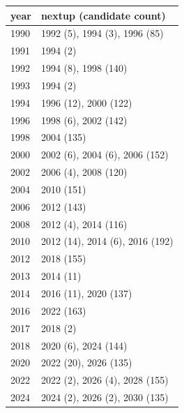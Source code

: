 \footnotesize\begin{tabular}[t]{ll}
\toprule
year & nextup (candidate count)\\
\midrule
1990 & 1992 (5), 1994 (3), 1996 (85)\\
1991 & 1994 (2)\\
1992 & 1994 (8), 1998 (140)\\
1993 & 1994 (2)\\
1994 & 1996 (12), 2000 (122)\\
1996 & 1998 (6), 2002 (142)\\
1998 & 2004 (135)\\
2000 & 2002 (6), 2004 (6), 2006 (152)\\
2002 & 2006 (4), 2008 (120)\\
2004 & 2010 (151)\\
2006 & 2012 (143)\\
2008 & 2012 (4), 2014 (116)\\
2010 & 2012 (14), 2014 (6), 2016 (192)\\
2012 & 2018 (155)\\
2013 & 2014 (11)\\
2014 & 2016 (11), 2020 (137)\\
2016 & 2022 (163)\\
2017 & 2018 (2)\\
2018 & 2020 (6), 2024 (144)\\
2020 & 2022 (20), 2026 (135)\\
2022 & 2022 (2), 2026 (4), 2028 (155)\\
2024 & 2024 (2), 2026 (2), 2030 (135)\\
\bottomrule
\end{tabular}
